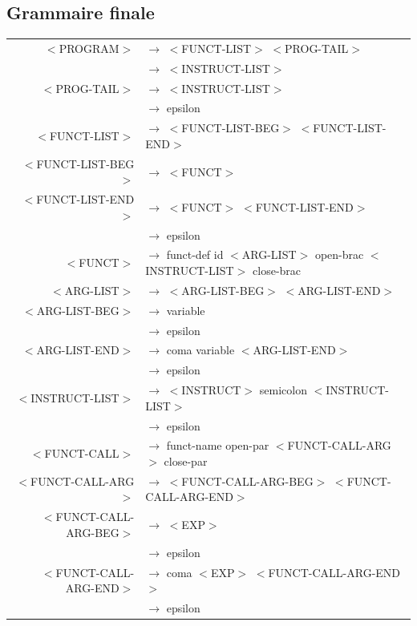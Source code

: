\documentclass[a4paper,10pt]{article}
\begin{document}
\subsection{Grammaire finale}

\hspace{-3.0cm}\begin{tabular}{rl}	
	$<$PROGRAM$>$				& $\rightarrow$ $<$FUNCT-LIST$>$ $<$PROG-TAIL$>$ \\
								& $\rightarrow$ $<$INSTRUCT-LIST$>$ \\
	$<$PROG-TAIL$>$				& $\rightarrow$ $<$INSTRUCT-LIST$>$ \\
								& $\rightarrow$ epsilon \\
						
	$<$FUNCT-LIST$>$			& $\rightarrow$ $<$FUNCT-LIST-BEG$>$ $<$FUNCT-LIST-END$>$ \\
	$<$FUNCT-LIST-BEG$>$		& $\rightarrow$ $<$FUNCT$>$ \\
	$<$FUNCT-LIST-END$>$		& $\rightarrow$ $<$FUNCT$>$ $<$FUNCT-LIST-END$>$ \\
								& $\rightarrow$ epsilon \\
	$<$FUNCT$>$					& $\rightarrow$ funct-def id $<$ARG-LIST$>$ open-brac $<$INSTRUCT-LIST$>$ close-brac \\
	$<$ARG-LIST$>$				& $\rightarrow$ $<$ARG-LIST-BEG$>$ $<$ARG-LIST-END$>$ \\
	$<$ARG-LIST-BEG$>$			& $\rightarrow$ variable \\
								& $\rightarrow$ epsilon \\
	$<$ARG-LIST-END$>$			& $\rightarrow$ coma variable $<$ARG-LIST-END$>$ \\
								& $\rightarrow$ epsilon \\
	$<$INSTRUCT-LIST$>$			& $\rightarrow$ $<$INSTRUCT$>$ semicolon $<$INSTRUCT-LIST$>$ \\
								& $\rightarrow$ epsilon \\
	$<$FUNCT-CALL$>$			& $\rightarrow$ funct-name open-par $<$FUNCT-CALL-ARG$>$ close-par \\
	$<$FUNCT-CALL-ARG$>$		& $\rightarrow$ $<$FUNCT-CALL-ARG-BEG$>$ $<$FUNCT-CALL-ARG-END$>$ \\
	$<$FUNCT-CALL-ARG-BEG$>$	& $\rightarrow$ $<$EXP$>$ \\
								& $\rightarrow$ epsilon \\
	$<$FUNCT-CALL-ARG-END$>$	& $\rightarrow$ coma $<$EXP$>$ $<$FUNCT-CALL-ARG-END$>$ \\
								& $\rightarrow$ epsilon \\

\end{tabular}
\end{document}
